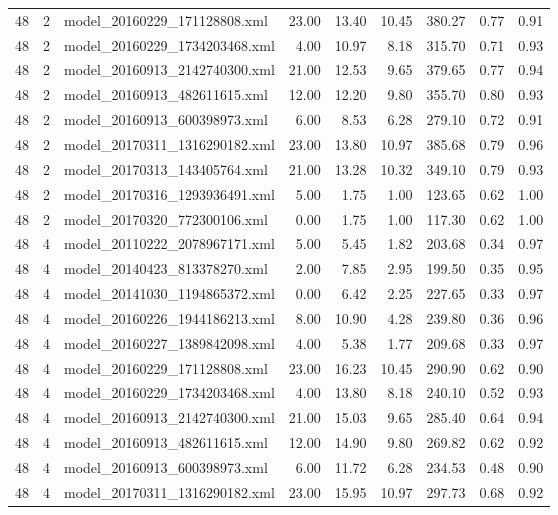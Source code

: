 \begin{table}[ht]
\begin{tabular}{rrlrrrrrr}
   48 &   2 & model\_20160229\_171128808.xml & 23.00 & 13.40 & 10.45 & 380.27 & 0.77 & 0.91 \\ 
   48 &   2 & model\_20160229\_1734203468.xml & 4.00 & 10.97 & 8.18 & 315.70 & 0.71 & 0.93 \\ 
   48 &   2 & model\_20160913\_2142740300.xml & 21.00 & 12.53 & 9.65 & 379.65 & 0.77 & 0.94 \\ 
   48 &   2 & model\_20160913\_482611615.xml & 12.00 & 12.20 & 9.80 & 355.70 & 0.80 & 0.93 \\ 
   48 &   2 & model\_20160913\_600398973.xml & 6.00 & 8.53 & 6.28 & 279.10 & 0.72 & 0.91 \\ 
   48 &   2 & model\_20170311\_1316290182.xml & 23.00 & 13.80 & 10.97 & 385.68 & 0.79 & 0.96 \\ 
   48 &   2 & model\_20170313\_143405764.xml & 21.00 & 13.28 & 10.32 & 349.10 & 0.79 & 0.93 \\ 
   48 &   2 & model\_20170316\_1293936491.xml & 5.00 & 1.75 & 1.00 & 123.65 & 0.62 & 1.00 \\ 
   48 &   2 & model\_20170320\_772300106.xml & 0.00 & 1.75 & 1.00 & 117.30 & 0.62 & 1.00 \\ 
   48 &   4 & model\_20110222\_2078967171.xml & 5.00 & 5.45 & 1.82 & 203.68 & 0.34 & 0.97 \\ 
   48 &   4 & model\_20140423\_813378270.xml & 2.00 & 7.85 & 2.95 & 199.50 & 0.35 & 0.95 \\ 
   48 &   4 & model\_20141030\_1194865372.xml & 0.00 & 6.42 & 2.25 & 227.65 & 0.33 & 0.97 \\ 
   48 &   4 & model\_20160226\_1944186213.xml & 8.00 & 10.90 & 4.28 & 239.80 & 0.36 & 0.96 \\ 
   48 &   4 & model\_20160227\_1389842098.xml & 4.00 & 5.38 & 1.77 & 209.68 & 0.33 & 0.97 \\ 
   48 &   4 & model\_20160229\_171128808.xml & 23.00 & 16.23 & 10.45 & 290.90 & 0.62 & 0.90 \\ 
   48 &   4 & model\_20160229\_1734203468.xml & 4.00 & 13.80 & 8.18 & 240.10 & 0.52 & 0.93 \\ 
   48 &   4 & model\_20160913\_2142740300.xml & 21.00 & 15.03 & 9.65 & 285.40 & 0.64 & 0.94 \\ 
   48 &   4 & model\_20160913\_482611615.xml & 12.00 & 14.90 & 9.80 & 269.82 & 0.62 & 0.92 \\ 
   48 &   4 & model\_20160913\_600398973.xml & 6.00 & 11.72 & 6.28 & 234.53 & 0.48 & 0.90 \\ 
   48 &   4 & model\_20170311\_1316290182.xml & 23.00 & 15.95 & 10.97 & 297.73 & 0.68 & 0.92 \\ 

\end{tabular}
\end{table}
